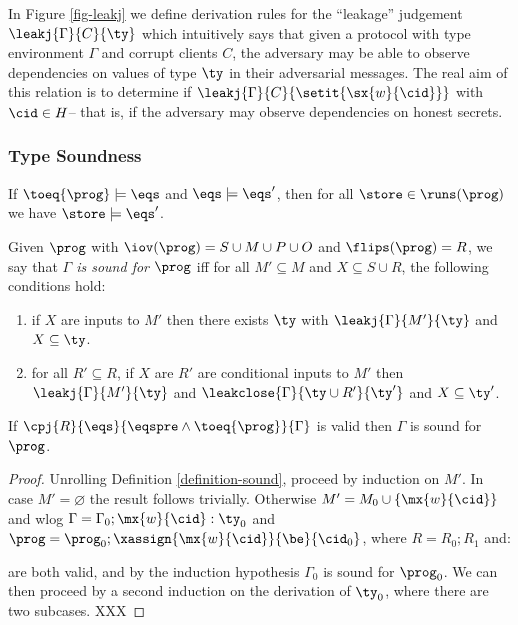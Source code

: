 In Figure \ref{fig-leakj} we define derivation rules for the
``leakage'' judgement $\leakj{\Gamma}{C}{\ty}$ which intuitively says
that given a protocol with type environment $\Gamma$ and corrupt
clients $C$, the adversary may be able to observe dependencies on
values of type $\ty$ in their adversarial messages.  The real aim of
this relation is to determine if
$\leakj{\Gamma}{C}{\setit{\sx{w}{\cid}}}$ with $\cid \in H$-- that is,
if the adversary may observe dependencies on honest secrets.

\subsubsection{Type Soundness}


\begin{lemma}
  \label{lemma-eqsprogsound}
  If $\toeq{\prog} \models \eqs$ and $\eqs \models \eqs'$, then
  for all $\store \in \runs(\prog)$ we have $\store \models \eqs'$.
\end{lemma}

\begin{definition}
  \label{definition-sound}
  Given $\prog$ with $\iov(\prog) = S \cup M \cup P \cup O$
  and $\flips(\prog) = R$, we say that
  \emph{$\Gamma$ is sound for $\prog$} iff for all $M' \subseteq M$
      and $X \subseteq S \cup R$, the following
      conditions hold:
  \begin{enumerate}[\hspace{5mm}i.]
    \item  if $X$ are inputs to $M'$ then
      there exists $\ty$ with $\leakj{\Gamma}{M'}{\ty}$ and $X \subseteq \ty$.
    \item  for all  $R' \subseteq R$, if
      $X$ are $R'$ are conditional inputs to $M'$ then $\leakj{\Gamma}{M'}{\ty}$
      and $\leakclose{\Gamma}{\ty \cup R'}{\ty'}$ and $X \subseteq \ty'$.
  \end{enumerate}
\end{definition}

\begin{lemma}
  \label{lemma-cpjsound}
  If $\cpj{R}{\eqs}{\eqspre \wedge \toeq{\prog}}{\Gamma}$ is valid then $\Gamma$ is
  sound for $\prog$.
\end{lemma}
\begin{proof}
  Unrolling Definition \ref{definition-sound}, proceed by induction on $M'$.
  In case $M' = \varnothing$ the result follows trivially. Otherwise
  $M' = M_0 \cup \{ \mx{w}{\cid} \}$ and wlog $\Gamma = \Gamma_0; \mx{w}{\cid} : \ty_0$
  and $\prog = \prog_0;\xassign{\mx{w}{\cid}}{\be}{\cid_0}$, where $R = R_0;R_1$ and:
  \begin{mathpar}

  \end{mathpar}
  are both valid, and by the induction hypothesis $\Gamma_0$ is sound for $\prog_0$.
  We can then proceed by a second induction on the derivation of $\ty_0$, where there
  are two subcases. XXX
\end{proof}


